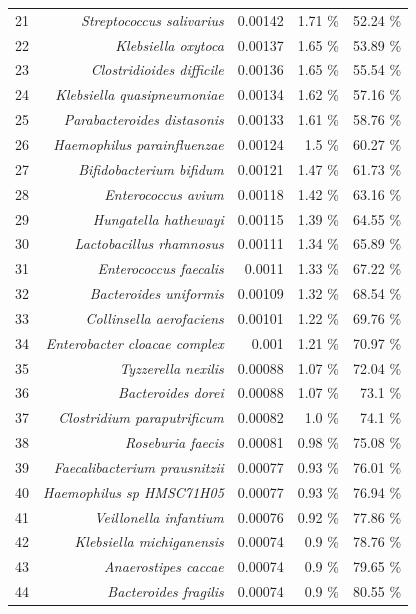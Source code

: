 \documentclass{article}
\begin{document}
\begin{table}
\begin{centering}
\begin{tabular}{|r|r|r|r|r|}
  21 & \textit{Streptococcus salivarius} & 0.00142 & 1.71 \% & 52.24 \% \\
  22 & \textit{Klebsiella oxytoca} & 0.00137 & 1.65 \% & 53.89 \% \\
  23 & \textit{Clostridioides difficile} & 0.00136 & 1.65 \% & 55.54 \% \\
  24 & \textit{Klebsiella quasipneumoniae} & 0.00134 & 1.62 \% & 57.16 \% \\
  25 & \textit{Parabacteroides distasonis} & 0.00133 & 1.61 \% & 58.76 \% \\
  26 & \textit{Haemophilus parainfluenzae} & 0.00124 & 1.5 \% & 60.27 \% \\
  27 & \textit{Bifidobacterium bifidum} & 0.00121 & 1.47 \% & 61.73 \% \\
  28 & \textit{Enterococcus avium} & 0.00118 & 1.42 \% & 63.16 \% \\
  29 & \textit{Hungatella hathewayi} & 0.00115 & 1.39 \% & 64.55 \% \\
  30 & \textit{Lactobacillus rhamnosus} & 0.00111 & 1.34 \% & 65.89 \% \\
  31 & \textit{Enterococcus faecalis} & 0.0011 & 1.33 \% & 67.22 \% \\
  32 & \textit{Bacteroides uniformis} & 0.00109 & 1.32 \% & 68.54 \% \\
  33 & \textit{Collinsella aerofaciens} & 0.00101 & 1.22 \% & 69.76 \% \\
  34 & \textit{Enterobacter cloacae complex} & 0.001 & 1.21 \% & 70.97 \% \\
  35 & \textit{Tyzzerella nexilis} & 0.00088 & 1.07 \% & 72.04 \% \\
  36 & \textit{Bacteroides dorei} & 0.00088 & 1.07 \% & 73.1 \% \\
  37 & \textit{Clostridium paraputrificum} & 0.00082 & 1.0 \% & 74.1 \% \\
  38 & \textit{Roseburia faecis} & 0.00081 & 0.98 \% & 75.08 \% \\
  39 & \textit{Faecalibacterium prausnitzii} & 0.00077 & 0.93 \% & 76.01 \% \\
  40 & \textit{Haemophilus sp HMSC71H05} & 0.00077 & 0.93 \% & 76.94 \% \\
  41 & \textit{Veillonella infantium} & 0.00076 & 0.92 \% & 77.86 \% \\
  42 & \textit{Klebsiella michiganensis} & 0.00074 & 0.9 \% & 78.76 \% \\
  43 & \textit{Anaerostipes caccae} & 0.00074 & 0.9 \% & 79.65 \% \\
  44 & \textit{Bacteroides fragilis} & 0.00074 & 0.9 \% & 80.55 \% \\

\end{tabular}
\end{centering}
\end{table}
\end{document}

